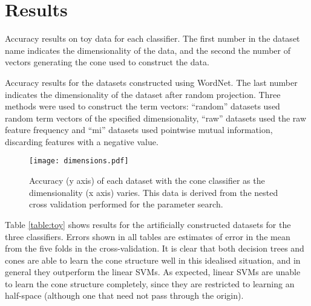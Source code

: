 \section{Results}


\begin{table*}
\begin{center}
\end{center}
\caption{Accuracy results on toy data for each classifier. The first
  number in the dataset name indicates the dimensionality of the data,
  and the second the number of vectors generating the cone used
  to construct the data.}
\label{table:toy}
\end{table*}

\begin{table*}
\begin{center}
\end{center}
\caption{Accuracy results for the datasets constructed using WordNet.
  The last number indicates the dimensionality of the
  dataset after random projection. Three methods were used to construct the term vectors:
  ``random'' datasets used random term vectors of the specified
  dimensionality, ``raw'' datasets used the raw feature frequency and
  ``mi'' datasets used pointwise mutual information, discarding
  features with a negative value.}
\label{table:wn}
\end{table*}

\begin{figure}
\begin{center}
\texttt{[image: dimensions.pdf]}
\end{center}
\caption{Accuracy (y axis) of each dataset with the cone classifier as
  the dimensionality (x axis) varies. This data is derived from the
  nested cross validation performed for the parameter search.}
\label{fig:dim}
\end{figure}

Table \ref{table:toy} shows results for the artificially constructed
datasets for the three classifiers. Errors shown in all tables are
estimates of error in the mean from the five folds in the
cross-validation. It is clear that both decision trees and cones are
able to learn the cone structure well in this idealised situation, and
in general they outperform the linear SVMs.  As expected, linear SVMs
are unable to learn the cone structure completely, since they are
restricted to learning an half-space (although one that need not pass
through the origin).


